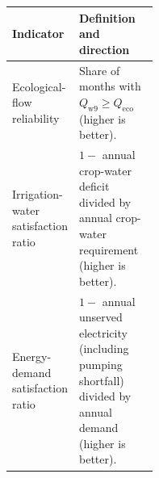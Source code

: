 \documentclass [a4paper,fleqn] {cas-dc}
\begin{document}
\noindent\begin{minipage}{\columnwidth}
\makeatletter{}\makeatother
\caption{System performance indicators}
\label{tab:system-performance-indicators}
\centering
\sffamily
\footnotesize
\setlength{\tabcolsep}{3pt}
\renewcommand{\arraystretch}{1.10}
\begin{tabularx}{\linewidth}{@{}>{\raggedright\arraybackslash}p{0.36\linewidth}
  >{\raggedright\arraybackslash}X@{}}
\toprule
Indicator & Definition and direction \\
\midrule
Ecological-flow reliability & Share of months with
$Q_{\mathrm{w9}}\geq Q_{\mathrm{eco}}$ (higher is better). \\
Irrigation-water satisfaction ratio & $1-$ annual crop-water deficit divided by
annual crop-water requirement (higher is better). \\
Energy-demand satisfaction ratio & $1-$ annual unserved electricity (including
pumping shortfall) divided by annual demand (higher is better). \\
\bottomrule
\end{tabularx}
\end{minipage}
\par\medskip

\end{document}
